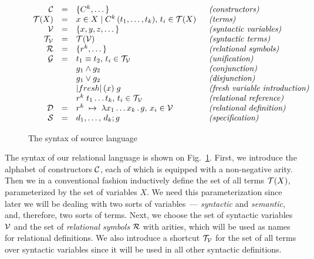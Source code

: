 \begin{figure}[t]
$$
\begin{array}{rcll}
\meta{C}    & = & \{C^k,\dots\}                                        & \;\;\mbox{\emph{(constructors)}}\\
\meta{T}(X) & = & x\in X \mid C^k\,(t_1,\dots,t_k),\,t_i\in \meta{T}(X) & \;\;\mbox{\emph{(terms)}}\\
\meta{V}    & = & \{x, y, z, \dots\}                                   & \;\;\mbox{\emph{(syntactic variables)}}\\
\meta{T_V}  & = & \meta{T}(\meta{V})                                   & \;\;\mbox{\emph{(syntactic terms)}}\\
\meta{R}    & = & \{r^k,\dots\}                                        & \;\;\mbox{\emph{(relational symbols)}}\\
\meta{G}    & = & t_1\equiv t_2,\,t_i\in\meta{T_V}                      & \;\;\mbox{\emph{(unification)}}\\ 
            &   & g_1\wedge g_2                                        & \;\;\mbox{\emph{(conjunction)}}\\
            &   & g_1\vee g_2                                          & \;\;\mbox{\emph{(disjunction)}}\\
            &   &\lstinline|fresh|\,(x)\;g                             & \;\;\mbox{\emph{(fresh variable introduction)}}\\
            &   &r^k\;t_1\dots t_k,\,t_i\in\meta{T_V}                   & \;\;\mbox{\emph{(relational reference)}}\\
\meta{D}    & = & r^k\binds\lambda x_1\dots x_k\,.\,g,\,x_i\in\meta{V}  & \;\;\mbox{\emph{(relational definition)}}\\
\meta{S}    & = & d_1,\dots,\,d_k; g                                    & \;\;\mbox{\emph{(specification)}}
\end{array}
$$
\caption{The syntax of source language}
\label{syntax}
\end{figure}

The syntax of our relational language is shown on Fig.~\ref{syntax}. First, we introduce the alphabet of constructors ${\cal{C}}$, each of which is equipped with a 
non-negative arity. Then we in a conventional fashion inductively define the set of all terms ${\cal{T}}(X)$, parameterized by the set of variables $X$. We need this parameterization 
since later we will be dealing with two sorts of variables~--- \emph{syntactic} and \emph{semantic}, and, therefore, two sorts of terms. Next, we choose the set of syntactic variables
${\cal{V}}$ and the set of \emph{relational symbols} ${\cal{R}}$ with arities, which will be used as names for relational definitions. We also introduce a shortcut
${\cal{T_V}}$ for the set of all terms over syntactic variables since it will be used in all other syntactic definitions.

